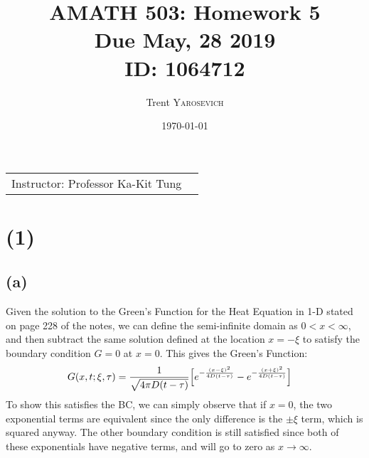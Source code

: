 \documentclass{article}
\title{AMATH 503: Homework 5 \\Due May, 28 2019 \\ ID: 1064712} %
\author{Trent \textsc{Yarosevich}} %
\date{\today} %
\begin{document}
\maketitle %
\setlength\parindent{1cm}

\begin{center}
\begin{tabular}{l r}
Instructor: Professor Ka-Kit Tung %
\end{tabular}
\end{center}
\doublespacing

\section*{\textbf{(1)}}
\subsection*{\textbf{(a)}}
Given the solution to the Green's Function for the Heat Equation in 1-D stated on page 228 of the notes, we can define the semi-infinite domain as $0<x<\infty$, and then subtract the same solution defined at the location $x = -\xi$ to satisfy the boundary condition $G=0$ at $x=0$. This gives the Green's Function:
\begin{equation}
\begin{aligned}
G(x, t;\xi, \tau) &= \frac{1}{\sqrt{4\pi D(t-\tau)}}\Big{[} e^{-\frac{(x-\xi)^2}{4D(t-\tau)}} -e^{-\frac{(x+\xi)^2}{4D(t-\tau)}}\Big{]}
\end{aligned}
\end{equation}
To show this satisfies the BC, we can simply observe that if $x=0$, the two exponential terms are equivalent since the only difference is the $\pm\xi$ term, which is squared anyway. The other boundary condition is still satisfied since both of these exponentials have negative terms, and will go to zero as $x\to\infty$.
\end{document}
